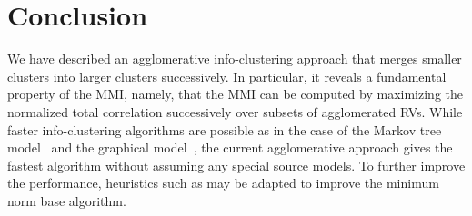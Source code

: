 \section{Conclusion}
\label{sec:conclusions}
%
We have described an
agglomerative info-clustering approach that merges smaller clusters into larger clusters
successively. In particular, it reveals a fundamental property of the MMI, namely, that the MMI can be computed by
maximizing the normalized total correlation successively over subsets of agglomerated RVs. While
faster info-clustering algorithms are possible as in the case of the Markov tree
model~\cite{chan16cluster} and the graphical model~\cite{chan17ita,kolmogorov10}, the current
agglomerative approach gives the fastest algorithm without assuming any special source models. To
further improve the performance, heuristics such as \cite{jegelka2011fast} may be adapted to improve
the minimum norm base algorithm.
